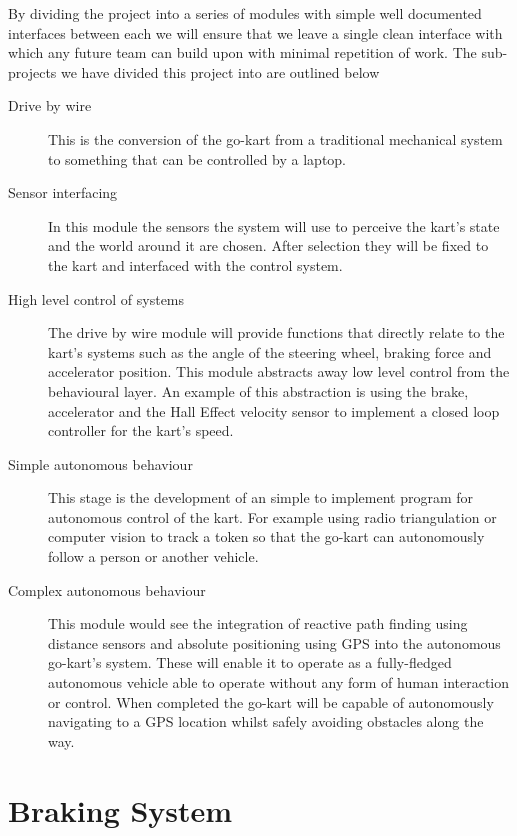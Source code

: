 By dividing the project into a series of modules with simple well documented interfaces between each we will ensure that we leave a single clean interface with which any future team can build upon with minimal repetition of work. The sub-projects we have divided this project into are outlined below
\begin{description}
\item[Drive by wire] This is the conversion of the go-kart from a traditional mechanical system to something that can be controlled by a laptop. 

\item[Sensor interfacing] In this module the sensors the system will use to perceive the kart's state and the world around it are chosen. After selection they will be fixed to the kart and interfaced with the control system. 

\item[High level control of systems] The drive by wire module will provide functions that directly relate to the kart's systems such as the angle of the steering wheel, braking force and accelerator position. This module abstracts away low level control from the behavioural layer. An example of this abstraction is using the brake, accelerator and the Hall Effect velocity sensor to implement a closed loop controller for the kart's speed.  

\item[Simple autonomous behaviour] This stage is the development of an simple to implement program for autonomous control of the kart. For example using radio triangulation or computer vision to track a token so that the go-kart can autonomously follow a person or another vehicle.

\item[Complex autonomous behaviour] This module would see the integration of reactive path finding using distance sensors and absolute positioning using GPS into the autonomous go-kart's system. These will enable it to operate as a fully-fledged autonomous vehicle able to operate without any form of human interaction or control. When completed the go-kart will be capable of autonomously navigating to a GPS location whilst safely avoiding obstacles along the way.
\end{description}

\section{Braking System}

